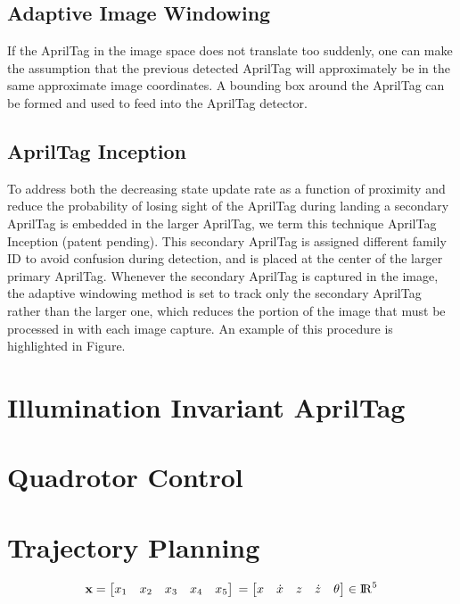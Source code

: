 \documentclass[letterpaper, 10 pt, conference]{ieeeconf}
\begin{document}
\subsection{Adaptive Image Windowing}
If the AprilTag in the image space does not translate too suddenly, one can
make the assumption that the previous detected AprilTag will approximately be
in the same approximate image coordinates. A bounding box around the AprilTag
can be formed and used to feed into the AprilTag detector.

\subsection{AprilTag Inception}
To address both the decreasing state update rate as a function of proximity and
reduce the probability of losing sight of the AprilTag during landing a
secondary AprilTag is embedded in the larger AprilTag, we term this technique
AprilTag Inception (patent pending). This secondary AprilTag is assigned
different family ID to avoid confusion during detection, and is placed at the
center of the larger primary AprilTag. Whenever the secondary AprilTag is
captured in the image, the adaptive windowing method is set to track only the
secondary AprilTag rather than the larger one, which reduces the portion of the
image that must be processed in with each image capture. An example of this
procedure is highlighted in Figure.

\section{Illumination Invariant AprilTag}


\section{Quadrotor Control}


\section{Trajectory Planning}

\begin{equation}
  \textbf{x} = \begin{bmatrix}
      x_{1} & x_{2} & x_{3} & x_{4} & x_{5}
    \end{bmatrix} \\ 
    = \begin{bmatrix}
      x & \dot{x} & z & \dot{z} & \theta
    \end{bmatrix} \in {\rm I\!R}^{5}
\end{equation}
\end{document}
